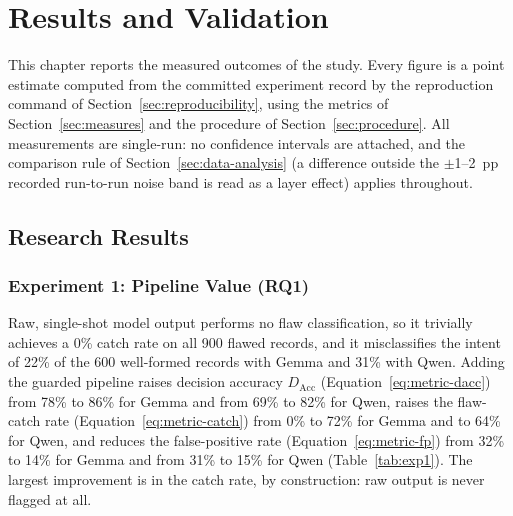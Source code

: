 \chapter{Results and Validation}\label{ch:results}

This chapter reports the measured outcomes of the study. Every figure is a
point estimate computed from the committed experiment record by the
reproduction command of Section~\ref{sec:reproducibility}, using the metrics
of Section~\ref{sec:measures} and the procedure of Section~\ref{sec:procedure}.
All measurements are single-run: no confidence intervals are attached, and the
comparison rule of Section~\ref{sec:data-analysis} (a difference outside the
$\pm$1--2~pp recorded run-to-run noise band is read as a layer effect) applies
throughout.

\section{Research Results}\label{sec:results-research}

\subsection{Experiment 1: Pipeline Value (RQ1)}\label{sec:exp1}

Raw, single-shot model output performs no flaw classification, so it trivially
achieves a 0\% catch rate on all 900 flawed records, and it misclassifies the
intent of 22\% of the 600 well-formed records with Gemma and 31\% with Qwen.
Adding the guarded pipeline raises decision accuracy $D_{\mathrm{Acc}}$
(Equation~\ref{eq:metric-dacc}) from 78\% to 86\% for Gemma and from 69\% to
82\% for Qwen, raises the flaw-catch rate (Equation~\ref{eq:metric-catch}) from
0\% to 72\% for Gemma and to 64\% for Qwen, and reduces the false-positive rate
(Equation~\ref{eq:metric-fp}) from 32\% to 14\% for Gemma and from 31\% to 15\%
for Qwen (Table~\ref{tab:exp1}). The largest improvement is in the catch rate,
by construction: raw output is never flagged at all.


